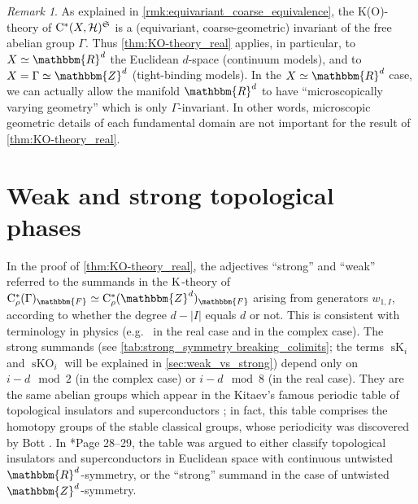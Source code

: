 \documentclass{amsart}
\numberwithin{figure}{section}
\numberwithin{equation}{section}
\numberwithin{table}{section}
\theoremstyle{plain}
\theoremstyle{definition}
\theoremstyle{remark}
\newtheorem{remark}[equation]{Remark}
\theoremstyle{nonumber}
\newcommand{\Z}{\mathbb{Z}}
\newcommand{\R}{\mathbb{R}}
\newcommand{\F}{\mathbb{F}}
\newcommand{\K}{\relax\ifmmode\operatorname{K}\else\textup{K}\fi}
\newcommand{\sK}{\operatorname{sK}}
\newcommand{\sKO}{\operatorname{sKO}}
\newcommand{\Cst}{\relax\ifmmode\mathrm{C}^*\else\textup{C*}\fi}
\newcommand{\Cstr}{\Cst_\rho} %
\renewcommand{\mathbb}{\mathbbm} %
\begin{document}
\begin{remark}\label{rem:micro.geom.irrelevant}
As explained in \cref{rmk:equivariant_coarse_equivalence}, the K(O)-theory
of \( \Cst(X,\mathcal{H})^{\mathfrak{S}} \) 
is a (equivariant, coarse-geometric)
invariant of the free abelian group \( \Gamma \). Thus  
\cref{thm:KO-theory_real} applies, in particular, to $X\simeq\R^d$ the
Euclidean $d$-space (continuum models), and to $X=\Gamma\simeq\Z^d$ (tight-binding
models). In the $X\simeq\R^d$ case, we can actually allow the manifold
$\R^d$ to have ``microscopically varying geometry'' which is only
$\Gamma$-invariant. In other words, microscopic geometric details of each fundamental
domain are not important for the result of \cref{thm:KO-theory_real}.
\end{remark}


\section{Weak and strong topological phases}
\label{sec:weak_strong_phases}
In the proof of \cref{thm:KO-theory_real}, the adjectives ``strong'' and
``weak'' referred to the summands in the $\K$-theory of
$\Cstr(\Gamma)_\F\simeq\Cstr(\Z^d)_\F$ arising from generators 
$w_{1,I}$,
according to whether the degree 
$d-|I|$ equals $d$ or not. This is
consistent with terminology in physics
(e.g.~\cites{Fu-Kane-Mele:TI_in_3D,Fu-Kane:Topological_insulators_with_inversion_symmetry}
in the real case and \cites{Prodan-SBaldes:Complex_topological_insulators}
in the complex case).  The strong summands (see
\cref{tab:strong_symmetry breaking_colimits}; the terms \( \sK_i \) and \(
\sKO_i \) will be explained in \cref{sec:weak_vs_strong}) depend only on \(
i-d\mod 2 \) (in the complex case) or \( i-d\mod 8 \) (in the real case).
They are the same abelian groups which appear in the Kitaev's famous
periodic table of topological insulators and
superconductors \cite{Kitaev:Periodic_table}; in fact, this table comprises the homotopy groups of the
stable classical groups, whose periodicity was discovered by Bott
\cite{Bott:Periodicity}.  In \cite{Kitaev:Periodic_table}*{Page 28--29},
the table was argued to either classify topological insulators and
superconductors in Euclidean space with continuous untwisted
$\R^d$-symmetry, or the ``strong'' summand in the case of untwisted
$\Z^d$-symmetry.
\end{document}
